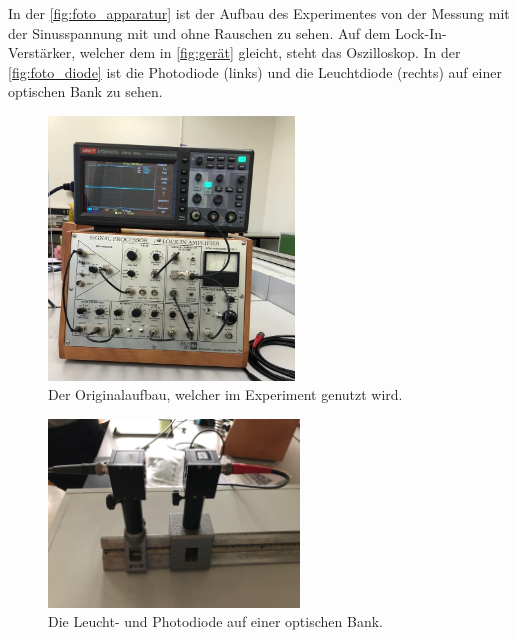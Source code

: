     \noindent In der \autoref{fig:foto_apparatur} ist der Aufbau des Experimentes von der Messung mit der Sinusspannung mit und ohne
    Rauschen zu sehen. Auf dem Lock-In-Verstärker, welcher dem in \autoref{fig:gerät} gleicht, steht das Oszilloskop.  
    In der \autoref{fig:foto_diode} ist die Photodiode (links) und die Leuchtdiode (rechts) auf einer optischen Bank 
    zu sehen.

    \begin{figure}
        \centering
        \includegraphics[width=\textwidth,height=7cm,keepaspectratio]{bilder/foto_apparatur.jpeg}
        \caption{Der Originalaufbau, welcher im Experiment genutzt wird.}
        \label{fig:foto_apparatur}
    \end{figure}

    \begin{figure}
        \centering
        \includegraphics[width=\textwidth,height=5cm,keepaspectratio]{bilder/foto_diode.jpeg}
        \caption{Die Leucht- und Photodiode auf einer optischen Bank.}
        \label{fig:foto_diode}
    \end{figure}